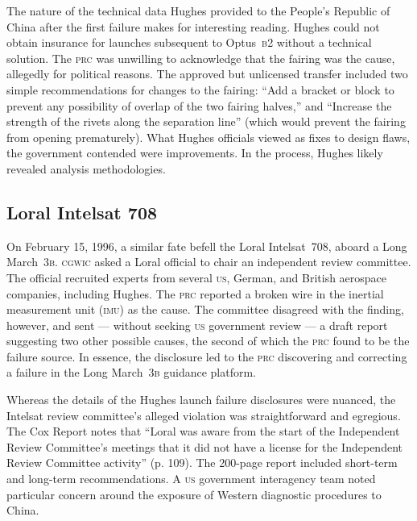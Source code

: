 \documentclass[preprint,twocolumn,5p]{elsarticle}
\begin{document}
The nature of the technical data Hughes provided to the People's Republic of China after the first failure makes for interesting reading. Hughes could not obtain insurance for launches subsequent to Optus~\textsc{b2} without a technical solution. The \textsc{prc} was unwilling to acknowledge that the fairing was the cause, allegedly for political reasons. The approved but unlicensed transfer included two simple recommendations for changes to the fairing: ``Add a bracket or block to prevent any possibility of overlap of the two fairing halves,'' and ``Increase the strength of the rivets along the separation line'' (which would prevent the fairing from opening prematurely). What Hughes officials viewed as fixes to design flaws, the government contended were improvements. In the process, Hughes likely revealed analysis methodologies. \citep{Cox1999} %

\subsection{Loral Intelsat 708}
On February 15, 1996, a similar fate befell the Loral Intelsat~708, aboard a Long March~\textsc{3b}. \textsc{cgwic} asked a Loral official to chair an independent review committee. The official recruited experts from several \textsc{us}, German, and British aerospace companies, including Hughes. The \textsc{prc} reported a broken wire in the inertial measurement unit (\textsc{imu}) as the cause. The committee disagreed with the finding, however, and sent --- without seeking \textsc{us} government review --- a draft report suggesting two other possible causes, the second of which the \textsc{prc} found to be the failure source. In essence, the disclosure led to the \textsc{prc} discovering and correcting a failure in the Long March~\textsc{3b} guidance platform. \citep{Cox1999}

Whereas the details of the Hughes launch failure disclosures were nuanced, the Intelsat review committee's alleged violation was straightforward and egregious. The Cox Report notes that ``Loral was aware from the start of the Independent Review Committee's meetings that it did not have a license for the Independent Review Committee activity'' (p. 109). The 200-page report included short-term and long-term recommendations. A \textsc{us} government interagency team noted particular concern around the exposure of Western diagnostic procedures to China. \citep{Cox1999}
\end{document}
